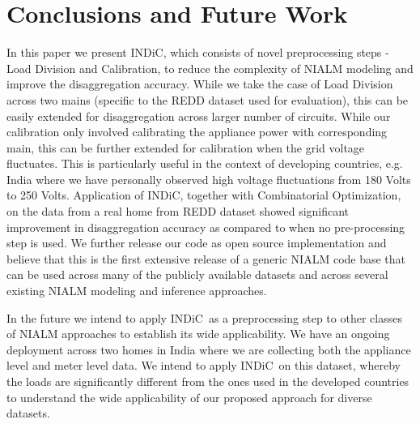 \documentclass[conference]{IEEEtran}
\newcommand{\indic}{INDiC~}
\newcommand{\indicns}{INDiC}
\begin{document}
\section{Conclusions and Future Work}
\vspace{-1mm}
\noindent In this paper we present \indicns, which consists of novel preprocessing steps - Load Division and Calibration, to reduce the complexity of NIALM modeling and improve the disaggregation accuracy. While we take the case of Load Division across two mains (specific to the REDD dataset used for evaluation), this can be easily extended for disaggregation across larger number of circuits. While our calibration only involved calibrating the appliance power with corresponding main, this can be further extended for calibration when the grid voltage fluctuates. This is particularly useful in the context of developing countries, e.g. India where we have personally observed high voltage fluctuations from 180 Volts to 250 Volts. Application of \indicns, together with Combinatorial Optimization, on the data from a real home from REDD dataset showed significant improvement in disaggregation accuracy as compared to when no pre-processing step is used. We further release our code as open source implementation and believe that this is the first extensive release of a generic NIALM code base that can be used across many of the publicly available datasets and across several existing NIALM modeling and inference approaches. 

\noindent In the future we intend to apply \indic as a preprocessing step to other classes of NIALM approaches to establish its wide applicability. We have an ongoing deployment across two homes in India where we are collecting both the appliance level and meter level data. We intend to apply \indic on this dataset, whereby the loads are significantly different from the ones used in the developed countries to understand the wide applicability of our proposed approach for diverse datasets.


\vspace{-5mm}


\end{document}
